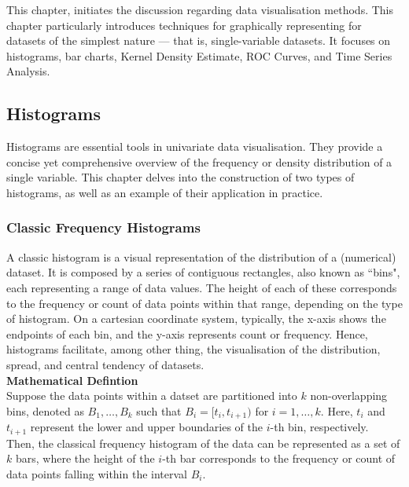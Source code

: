 \documentclass{article}\usepackage[]{graphicx}\usepackage[]{xcolor}
\numberwithin{equation}{section}
\begin{document}
This chapter, initiates the discussion regarding data visualisation methods. This chapter particularly introduces techniques for graphically representing for datasets of the simplest nature — that is, single-variable datasets. It focuses on histograms, bar charts, Kernel Density Estimate, ROC Curves, and Time Series Analysis. 

\subsection{Histograms}

\noindent Histograms are essential tools in univariate data visualisation. They provide a concise yet comprehensive overview of the frequency or density distribution of a single variable. This chapter delves into the construction of two types of histograms, as well as an example of their application in practice.

\subsubsection{Classic Frequency Histograms}

\noindent A classic histogram is a visual representation of the distribution of a (numerical) dataset. It is composed by a series of contiguous rectangles, also known as ``bins", each representing a range of data values. The height of each of these corresponds to the frequency or count of data points within that range, depending on the type of histogram. On a cartesian coordinate system, typically, the x-axis shows the endpoints of each bin, and the y-axis represents count or frequency. Hence, histograms facilitate, among other thing, the visualisation of the distribution, spread, and central tendency of datasets.\\

\noindent \textbf{Mathematical Defintion}\\
\noindent Suppose the data points within a datset are partitioned into $k$ non-overlapping bins, denoted as $B_1, \dots, B_k$ such that $B_i = [t_i, t_{i+1})$ for $i = 1, \dots, k$. Here, $t_i$ and $t_{i+1}$ represent the lower and upper boundaries of the $i$-th bin, respectively.\\

\noindent Then, the classical frequency histogram of the data can be represented as a set of $k$ bars, where the height of the $i$-th bar corresponds to the frequency or count of data points falling within the interval $B_i$.\\
\end{document}
